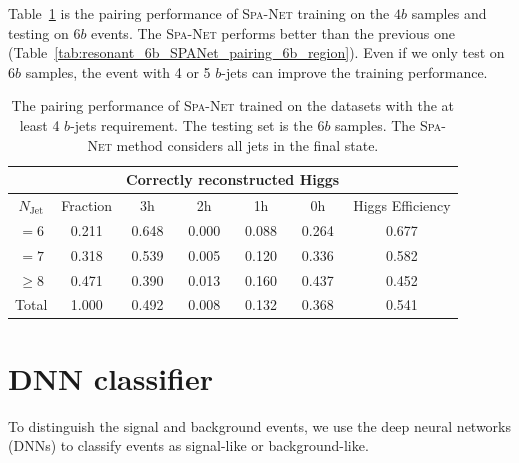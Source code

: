 \documentclass[12pt]{article}
\begin{document}
    Table~\ref{tab:resonant_4b_SPANet_pairing_6b_region} is the pairing performance of \textsc{Spa-Net} training on the $4b$ samples and testing on $6b$ events. The \textsc{Spa-Net} performs better than the previous one (Table~\ref{tab:resonant_6b_SPANet_pairing_6b_region}). Even if we only test on $6b$ samples, the event with 4 or 5 $b$-jets can improve the training performance.
    \begin{table}[htpb]
		\centering
        \caption{The pairing performance of \textsc{Spa-Net} trained on the datasets with the at least 4 $b$-jets requirement. The testing set is the $6b$ samples. The \textsc{Spa-Net} method considers all jets in the final state.}
		\label{tab:resonant_4b_SPANet_pairing_6b_region}
		\begin{tabular}{c|c|cccc|c}
			\multicolumn{1}{l|}{} &          & \multicolumn{4}{c|}{Correctly reconstructed Higgs} & \multicolumn{1}{l}{} \\ \hline
			$N_\text{Jet}$        & Fraction & 3h          & 2h         & 1h         & 0h         & Higgs Efficiency     \\ \hline
			$=6$                  & 0.211 & 0.648 & 0.000 & 0.088 & 0.264 & 0.677                \\
			$=7$                  & 0.318 & 0.539 & 0.005 & 0.120 & 0.336 & 0.582                \\
			$\ge 8$               & 0.471 & 0.390 & 0.013 & 0.160 & 0.437 & 0.452                \\ \hline
			Total                 & 1.000 & 0.492 & 0.008 & 0.132 & 0.368 & 0.541               
		\end{tabular}
	\end{table}
\section{DNN classifier}%
\label{sec:dnn_classifier}
    To distinguish the signal and background events, we use the deep neural networks (DNNs) to classify events as signal-like or background-like.
\end{document}
